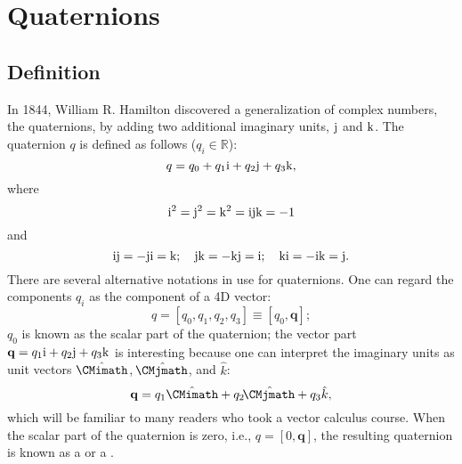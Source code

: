 \section{Quaternions}

\subsection{Definition}
In 1844, William R. Hamilton \cite{hamilton1844a} discovered a generalization of complex numbers, the quaternions, by adding two additional imaginary units, $\mathrm{j}$ and $\mathrm{k}$.  The quaternion $q$ is defined as follows ($q_i\in\mathbb{R}$):
\begin{equation}
	q = q_0 + q_1\mathrm{i}+q_2\mathrm{j}+q_3\mathrm{k},
\end{equation}
where
\begin{equation}
	\qi^2=\qj^2=\qk^2=\qi\qj\qk=-1\OClabel{eq:quatunits}
\end{equation}
and
\begin{equation}
	\mathrm{i}\mathrm{j}=-\mathrm{j}\mathrm{i}=\mathrm{k};\quad \mathrm{j}\mathrm{k}=-\mathrm{k}\mathrm{j}=\mathrm{i};\quad \mathrm{k}\mathrm{i}=-\mathrm{i}\mathrm{k}=\mathrm{j}.
\end{equation}
There are several alternative notations in use for quaternions. One can regard the components $q_i$ as the component of a 4D vector:
\begin{equation}
	q = \left[ q_0, q_1, q_2, q_3\right] \equiv \left[q_0,\mathbf{q}\right];
\end{equation}
$q_0$ is known as the scalar part  of the quaternion; the vector part $\mathbf{q}=q_1\mathrm{i}+q_2\mathrm{j}+q_3\mathrm{k}$ is interesting because one can interpret the imaginary units as unit vectors $\hat{\CMimath}$, $\hat{\mkern-3mu\CMjmath}$, and $\hat{k}$:
\begin{equation}
	\mathbf{q} = q_1\hat{\CMimath}+q_2\hat{\mkern-3mu\CMjmath}+q_3\hat{k},
\end{equation}
which will be familiar to many readers who took a vector calculus course.  When the scalar part of the quaternion is zero, i.e., $q=[0,\mathbf{q}]$, the resulting quaternion is known as a  or a .

